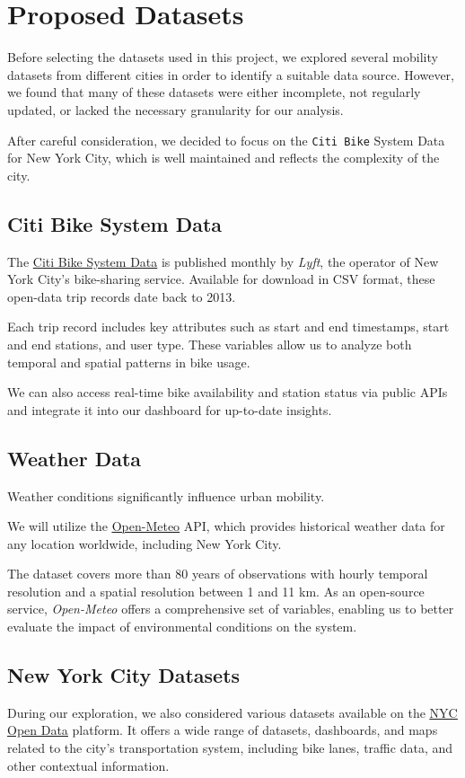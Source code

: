 \section{Proposed Datasets}
Before selecting the datasets used in this project, we explored several mobility datasets from different cities in order to identify a suitable data source.
However, we found that many of these datasets were either incomplete, not regularly updated, or lacked the necessary granularity for our analysis.

After careful consideration, we decided to focus on the \texttt{Citi Bike} System Data for New York City, which is well maintained and reflects the complexity of the city.

\subsection{Citi Bike System Data}
The \href{https://citibikenyc.com/system-data}{Citi Bike System Data} is published monthly by \textit{Lyft}, the operator of New York City's bike-sharing service.
Available for download in CSV format, these open-data trip records date back to 2013.

Each trip record includes key attributes such as start and end timestamps, start and end stations, and user type.
These variables allow us to analyze both temporal and spatial patterns in bike usage.

We can also access real-time bike availability and station status via public APIs and integrate it into our dashboard for up-to-date insights.

\subsection{Weather Data}
Weather conditions significantly influence urban mobility.

We will utilize the \href{https://open-meteo.com/}{\underline{Open-Meteo}} API, which provides historical weather data for any location worldwide, including New York City.

The dataset covers more than 80 years of observations with hourly temporal resolution and a spatial resolution between 1 and 11 km.
As an open-source service, \textit{Open-Meteo} offers a comprehensive set of variables, enabling us to better evaluate the impact of environmental conditions on the system.

\subsection{New York City Datasets}
During our exploration, we also considered various datasets available on the \href{https://opendata.cityofnewyork.us/}{\underline{NYC Open Data}} platform.
It offers a wide range of datasets, dashboards, and maps related to the city's transportation system, including bike lanes, traffic data, and other contextual information.

